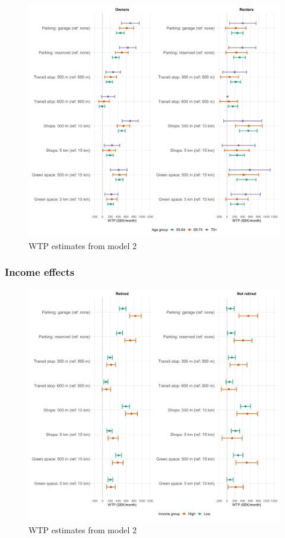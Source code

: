 \documentclass[3p,11pt ]{elsarticle}
\begin{document}


\begin{figure}[H]
\centering
\includegraphics[scale=0.30]{figures/wtp_age_interactions_own_rent_publication.png}
\caption{WTP estimates from model 2 \label{fig:wtp}}
\end{figure}


\clearpage


\subsubsection{Income effects}



\begin{figure}[H]
\centering
\includegraphics[scale=0.30]{figures/wtp_income_interactions_ret_notret_publication.png}
\caption{WTP estimates from model 2 \label{fig:wtp_income}}
\end{figure}
\end{document}

